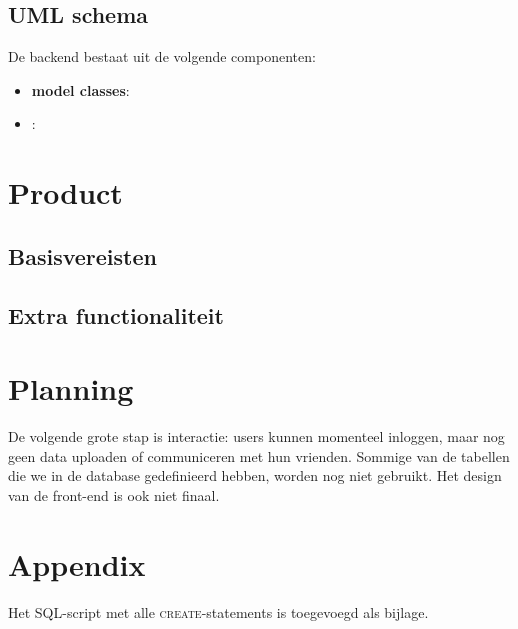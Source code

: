 \documentclass[12pt,a4paper]{article}
\begin{document}
\subsection{UML schema}

De backend bestaat uit de volgende componenten:

\begin{itemize}

\item \textbf{model classes}:  

\item \textbf{}:

\end{itemize}

\section{Product}

\subsection{Basisvereisten}

\subsection{Extra functionaliteit}

\section{Planning}
De volgende grote stap is interactie: users kunnen momenteel inloggen, maar nog
geen data uploaden of communiceren met hun vrienden. Sommige van de tabellen 
die we in de database gedefinieerd hebben, worden nog niet gebruikt. Het design 
van de front-end is ook niet finaal.

\section{Appendix}
Het SQL-script met alle \textsc{create}-statements is toegevoegd als bijlage.
\end{document}
